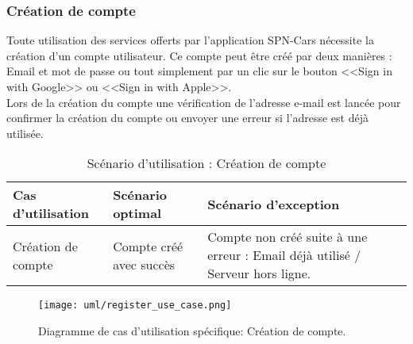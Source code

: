 \subsubsection{Création de compte}
Toute utilisation des services offerts par l'application SPN-Cars nécessite la création d'un compte utilisateur. Ce compte peut être créé par deux manières : Email et mot de passe ou tout simplement par un clic sur le bouton <<Sign in with Google>> ou <<Sign in with Apple>>.\\
\noindent Lors de la création du compte une vérification de l'adresse e-mail est lancée pour confirmer la création du compte ou envoyer une erreur si l'adresse est déjà utilisée.
\begin{table}[H]
    \begin{center}
        \begin{tabularx}{\textwidth} {
                | >{\centering\arraybackslash}X
                | >{\centering\arraybackslash}X
                | >{\centering\arraybackslash}X |}
            \hline
            Cas d'utilisation  & Scénario optimal        & Scénario d'exception                                                          \\
            \hline
            Création de compte & Compte créé avec succès & Compte non créé suite à une erreur : Email déjà utilisé / Serveur hors ligne. \\
            \hline
        \end{tabularx}
        \captionsetup{justification=centering}
        \caption{Scénario d'utilisation : Création de compte}
        \label{tab:register_scenario}
    \end{center}
\end{table}
\vspace{1cm}
\begin{figure}[H]
    \centering
    \texttt{[image: uml/register\_use\_case.png]}
    \captionsetup{justification = centering}
    \caption{Diagramme de cas d'utilisation spécifique: Création de compte.}
    \label{fig:register_use_case}
\end{figure}
